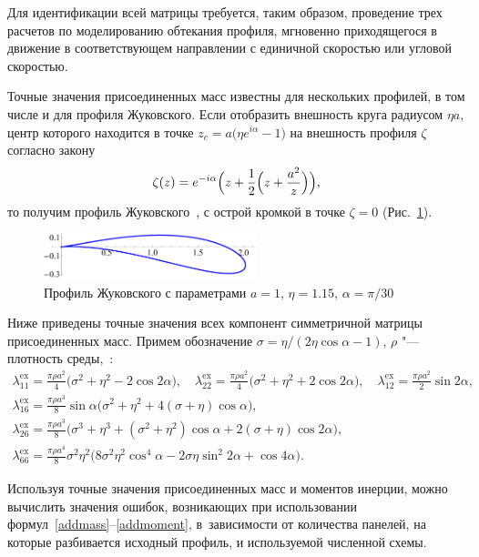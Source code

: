 \documentclass[12pt, a4paper]{article}
\begin{document}
\medskip


Для идентификации всей матрицы требуется, таким образом, проведение трех расчетов по моделированию обтекания профиля, мгновенно приходящегося в движение в соответствующем направлении с единичной скоростью или угловой скоростью.

Точные значения присоединенных масс известны для нескольких профилей, в том числе и для профиля Жуковского. Если отобразить внешность круга  радиусом $\eta a$, центр которого находится в точке $z_c = a\bigl(\eta e^{i \alpha} - 1\bigr)$ на внешность профиля $\zeta$ согласно закону%
\[
\zeta(z) = e^{-i \alpha} \Bigl(z + \frac12 \Bigl( z + \frac{a^2}{z}\Bigr)\Bigr),
\]
то получим профиль Жуковского~\cite{Sedov,Miln}, с острой кромкой в точке $\zeta = 0$ (Рис.~\ref{figZhuk}).
\begin{figure}[h]
	\centering
	\includegraphics[width=0.55\textwidth]{figWing}
	\caption{Профиль Жуковского с параметрами $a=1$, $\eta= 1.15$, $\alpha=\pi/30$}
	\label{figZhuk}
\end{figure}

Ниже приведены точные значения всех компонент симметричной матрицы присоединенных масс. Примем обозначение $\sigma = \eta/(2\eta\cos\alpha - 1)$, $\rho$ "--- плотность среды,~\cite{Sedov}:
\begin{gather*}
	\lambda^{\mathrm{ex}}_{11} = \frac{\pi \rho a^2}{4}\bigl(\sigma^2 + \eta^2 - 2\cos2\alpha\bigr), \quad
	\lambda^{\mathrm{ex}}_{22} = \frac{\pi \rho a^2}{4}\bigl(\sigma^2 + \eta^2 + 2\cos2\alpha\bigr), \quad
	\lambda^{\mathrm{ex}}_{12} = \frac{\pi \rho a^2}{2}\sin 2\alpha, \\
	\lambda^{\mathrm{ex}}_{16} = \frac{\pi \rho a^3}{8} \sin\alpha \bigl( \sigma^2 + \eta^2 + 4(\sigma+\eta)\cos\alpha \bigr), \\
	\lambda^{\mathrm{ex}}_{26} = \frac{\pi \rho a^3}{8} \bigl( \sigma^3 + \eta^3 + ( \sigma^2 + \eta^2)\cos\alpha  + 2(\sigma+\eta)\cos2\alpha \bigr),\\
	\lambda^{\mathrm{ex}}_{66} = \frac{\pi \rho a^4}{8} \sigma^2 \eta^2 \bigl( 8\sigma^2 \eta^2 \cos^4\alpha - 2 \sigma \eta \sin^2 2\alpha + \cos4\alpha \bigr).
\end{gather*}

Используя точные значения присоединенных масс и моментов инерции, можно вычислить значения ошибок, возникающих при использовании формул~\eqref{addmass}--\eqref{addmoment}, в~зависимости от количества панелей, на которые разбивается исходный профиль, и используемой численной схемы.
\end{document}
